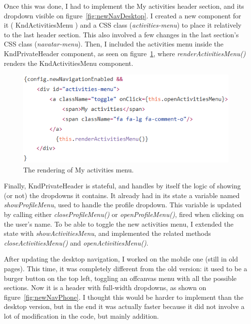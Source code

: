 Once this was done, I had to implement the \guillemotleft{} My activities \guillemotright{} header section, and its dropdown visible on {\sc figure}~\ref{fig:newNavDesktop}. I created a new component for it (\guillemotleft{} KndActivitiesMenu \guillemotright{}) and a CSS class (\textit{activities-menu}) to place it relatively to the last header section. This also involved a few changes in the last section's CSS class (\textit{navatar-menu}). Then, I included the activities menu inside the \guillemotleft{} KndPrivateHeader \guillemotright{} component, as seen on {\sc figure}~\ref{fig:activitiesImpl}, where \textit{renderActivitiesMenu()} renders the \guillemotleft{} KndActivitiesMenu \guillemotright{} component.

\begin{figure}[H]
    \centering
    \includegraphics{figure/activitiesImpl.png}
    \caption{The rendering of \guillemotleft{} My activities \guillemotright{} menu.}
    \label{fig:activitiesImpl}
\end{figure}

Finally, KndPrivateHeader is stateful, and handles by itself the logic of showing (or not) the dropdowns it contains. It already had in its state a variable named \textit{showProfileMenu}, used to handle the profile dropdown. This variable is updated by calling either \textit{closeProfileMenu()} or \textit{openProfileMenu()}, fired when clicking on the user's name. To be able to toggle the new activities menu, I extended the state with \textit{showActivitiesMenu}, and implemented the related methods \textit{closeActivitiesMenu()} and \textit{openActivitiesMenu()}.

After updating the desktop navigation, I worked on the mobile one (still in old pages). This time, it was completely different from the old version: it used to be a burger button on the top left, toggling an offcanvas menu with all the possible sections. Now it is a header with full-width dropdowns, as shown on {\sc figure}~\ref{fig:newNavPhone}. I thought this would be harder to implement than the desktop version, but in the end it was actually faster because it did not involve a lot of modification in the code, but mainly addition.

